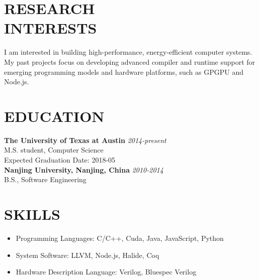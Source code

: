 \documentclass[margin, 9pt]{res} %
\begin{document}
\begin{resume}


\vspace*{-5pt}
\section{RESEARCH\\ INTERESTS} 

I am interested in building high-performance, energy-efficient computer systems. My past projects focus on developing advanced compiler and runtime support for emerging programming models and hardware platforms, such as GPGPU and Node.js.


\section{EDUCATION}

\textbf{The University of Texas at Austin} \hfill\textit{2014-present}\\
M.S. student, Computer Science\\
Expected Graduation Date: 2018-05\\

\vspace*{-5pt}
\textbf{Nanjing University, Nanjing, China} \hfill\textit{2010-2014}\\
B.S., Software Engineering

 
\section{SKILLS}

\vspace*{-1pt}
\begin{itemize}[leftmargin=*] \itemsep -4pt
	\item Programming Languages: C/C++, Cuda, Java, JavaScript, Python
	\item System Software: LLVM, Node.js, Halide, Coq
	\item Hardware Description Language: Verilog, Bluespec Verilog
\end{itemize}


\end{resume}
\end{document}
